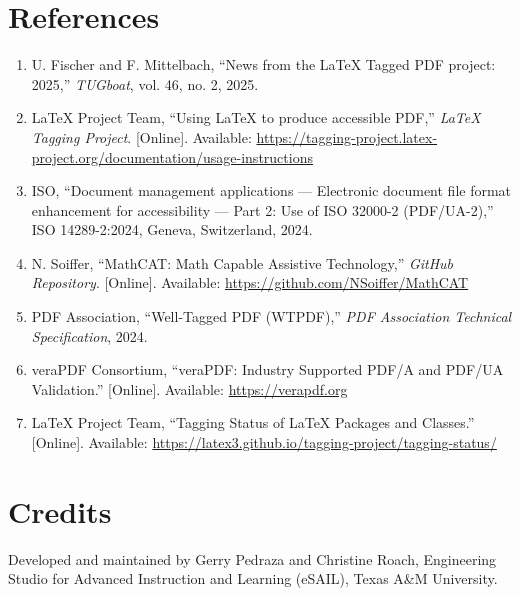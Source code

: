 \documentclass[11pt]{article}
\begin{document}
\section{References}
\label{sec:references}

\begin{enumerate}
    \item U. Fischer and F. Mittelbach, ``News from the LaTeX Tagged PDF project: 2025,'' \emph{TUGboat}, vol. 46, no. 2, 2025.

    \item LaTeX Project Team, ``Using LaTeX to produce accessible PDF,'' \emph{LaTeX Tagging Project}. [Online]. Available: \url{https://tagging-project.latex-project.org/documentation/usage-instructions}

    \item ISO, ``Document management applications --- Electronic document file format enhancement for accessibility --- Part 2: Use of ISO 32000-2 (PDF/UA-2),'' ISO 14289-2:2024, Geneva, Switzerland, 2024.

    \item N. Soiffer, ``MathCAT: Math Capable Assistive Technology,'' \emph{GitHub Repository}. [Online]. Available: \url{https://github.com/NSoiffer/MathCAT}

    \item PDF Association, ``Well-Tagged PDF (WTPDF),'' \emph{PDF Association Technical Specification}, 2024.

    \item veraPDF Consortium, ``veraPDF: Industry Supported PDF/A and PDF/UA Validation.'' [Online]. Available: \url{https://verapdf.org}

    \item LaTeX Project Team, ``Tagging Status of LaTeX Packages and Classes.'' [Online]. Available: \url{https://latex3.github.io/tagging-project/tagging-status/}
\end{enumerate}

\section{Credits}

Developed and maintained by Gerry Pedraza and Christine Roach, Engineering Studio for Advanced Instruction and Learning (eSAIL), Texas A\&M University.
\end{document}
